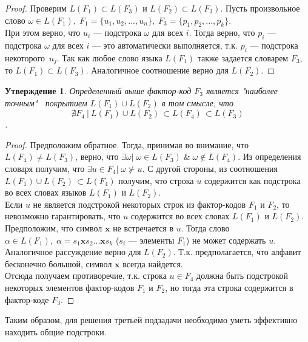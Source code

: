 \documentclass[14pt, russian]{scrartcl}
\newcounter{cStatement}
\newtheorem{Statement}{Утверждение}[cStatement]
\begin{document}
\begin{proof}
    Проверим $L(F_1) \subset L(F_3)$ и $L(F_2) \subset L(F_3)$.
    Пусть произвольное слово $\omega \in L(F_1), \; F_1 = \{ u_1, u_2, ..., u_n\}, \; 
    F_3 = \{p_1, p_2, ..., p_k\}$.
    \\
    При этом верно, что $u_i$ --- подстрока $\omega$ для всех $i$. Тогда верно, что $p_i$ --- подстрока $\omega$ для всех $i$ --- это автоматически выполняется, т.к. $p_i$ --- подстрока некоторого~$u_j$. 
    Так как любое слово языка $L(F_1)$ также задается словарем $F_3$, то 
    $L(F_1) \subset L(F_3)$. Аналогичное соотношение верно для $L(F_2)$.
\end{proof}

\begin{Statement}
    Определенный выше фактор-код $F_3$ является "наиболее точным" \, покрытием
    $L(F_1) \cup L(F_2) $
    в том смысле, что 
    $$ \nexists F_4\ | \ L(F_1) \cup L(F_2) \, \subset L(F_4) \, \subset L(F_3)$$.
\end{Statement}

\begin{proof}
    Предположим обратное. Тогда, принимая во внимание, что $L(F_4) \neq L(F_3)$, верно, что $\exists \omega | \; \omega \in L(F_3) \; \& \; \omega \notin L(F_4)$. Из определения словаря получим, что $\exists u \in F_4 | \; \omega \not \succ u$. С другой стороны, из соотношения
    $ L(F_1) \cup L(F_2) \, \subset L(F_4) $ получим, что строка $u$ содержится как подстрока во всех словах языков $L(F_1)$ и $L(F_2)$.
    \\
    Если $u$ не является подстрокой  некоторых строк из фактор-кодов $F_1$ и $F_2$, то невозможно гарантировать, что $u$ содержится во всех словах $L(F_1)$ и $L(F_2)$. Предположим, что символ $\textbf{x}$ не встречается в $u$. Тогда слово $\alpha \in L(F_1), \; \alpha = s_1\textbf{x}s_2...\textbf{x}s_k$ ($s_i$ --- элементы $F_1$) не может содержать $u$. Аналогичное рассуждение верно для $L(F_2)$. Т.к. предполагается, что алфавит бесконечно большой, символ $\textbf{x}$ всегда найдется.
    \\
    Отсюда получаем противоречие, т.к. строка $u \in F_4$ должна быть подстрокой некоторых элементов фактор-кодов $F_1$ и $F_2$, но тогда эта строка содержится в фактор-коде $F_3$.
\end{proof}


Таким образом, для решения третьей подзадачи необходимо уметь эффективно находить общие подстроки.
\end{document}
